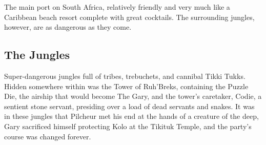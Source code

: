 The main port on South Africa, relatively friendly and very much like a Caribbean beach resort complete with great cocktails.  The surrounding jungles, however, are as dangerous as they come.

\smallskip

\subsection*{The Jungles}

Super-dangerous jungles full of tribes, trebuchets, and cannibal Tikki Tukks.  Hidden somewhere within was the Tower of Ruh'Breks, containing the Puzzle Die, the airship that would become The Gary, and the tower's caretaker, Codie, a sentient stone servant, presiding over a load of dead servants and snakes.  It was in these jungles that Pilcheur met his end at the hands of a creature of the deep, Gary sacrificed himself protecting Kolo at the Tikituk Temple, and the party's course was changed forever.

\smallskip

\bigskip

\clearpage
